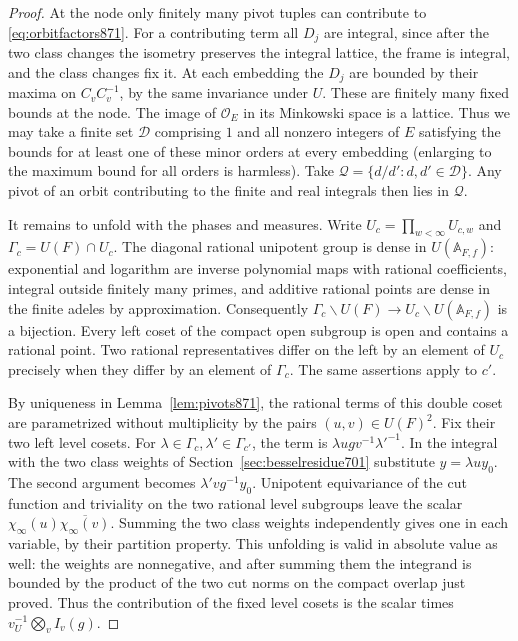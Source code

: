 \documentclass[a4paper,11pt]{article}
\theoremstyle{definition}
\theoremstyle{remark}
\numberwithin{equation}{section}
\begin{document}
\begin{proof}
At the node only finitely many pivot tuples can contribute to
\eqref{eq:orbitfactors871}. For a contributing term all \(D_j\)
are integral, since after the two class changes the isometry
preserves the integral lattice, the frame is integral, and the
class changes fix it. At each embedding the \(D_j\) are bounded
by their maxima on \(C_vC_v^{-1}\), by the same invariance
under \(U\). These are finitely many fixed bounds at the node.
The image of \(\mathcal O_E\) in its Minkowski space is a
lattice. Thus we may take a finite set \(\mathcal D\) comprising
\(1\) and all nonzero integers of \(E\) satisfying the bounds
for at least one of these minor orders at every embedding
(enlarging to the maximum bound for all orders is harmless).
Take \(\mathcal Q=\{d/d': d,d'\in\mathcal D\}\). Any pivot
of an orbit contributing to the finite and real integrals
then lies in \(\mathcal Q\).

It remains to unfold with the phases and measures. Write
\(U_c=\prod_{w<\infty}U_{c,w}\) and
\(\Gamma_c=U(F)\cap U_c\). The diagonal rational unipotent
group is dense in \(U(\mathbb A_{F,f})\): exponential and
logarithm are inverse polynomial maps with rational coefficients,
integral outside finitely many primes, and additive rational
points are dense in the finite adeles by approximation.
Consequently
\(\Gamma_c\backslash U(F)\longrightarrow
 U_c\backslash U(\mathbb A_{F,f})\) is a bijection.
Every left coset of the compact open subgroup is open and
contains a rational point. Two rational representatives differ
on the left by an element of \(U_c\) precisely when they differ
by an element of \(\Gamma_c\). The same assertions apply to \(c'\).

By uniqueness in Lemma~\ref{lem:pivots871}, the rational terms of
this double coset are parametrized without multiplicity by the
pairs \((u,v)\in U(F)^2\). Fix their two left level cosets.
For \(\lambda\in\Gamma_c,\lambda'\in\Gamma_{c'}\), the term
is \(\lambda u g v^{-1}\lambda'^{-1}\). In the integral with
the two class weights of Section~\ref{sec:besselresidue701}
substitute \(y=\lambda u y_0\). The second argument becomes
\(\lambda'v g^{-1}y_0\). Unipotent equivariance of the cut
function and triviality on the two rational level subgroups
leave the scalar \(\chi_\infty(u)\overline{\chi_\infty(v)}\).
Summing the two class weights independently gives one in each
variable, by their partition property. This unfolding is valid
in absolute value as well: the weights are nonnegative, and
after summing them the integrand is bounded by the product
of the two cut norms on the compact overlap just proved. Thus
the contribution of the fixed level cosets is the scalar times
\(v_U^{-1}\bigotimes_v I_v(g)\).


\end{proof}
\end{document}
